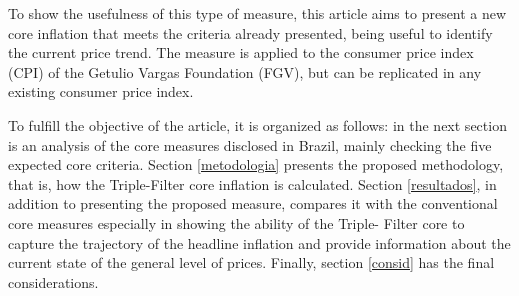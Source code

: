 \documentclass[10pt]{article}
\begin{document}

To show the usefulness of this type of measure, this article aims to present a new core inflation that meets the criteria already presented, being useful to identify the current price trend. The measure is applied to the consumer price index (CPI) of the Getulio Vargas Foundation (FGV), but can be replicated in any existing consumer price index.


To fulfill the objective of the article, it is organized as follows: in the next section is an analysis of the core measures disclosed in Brazil, mainly checking the five expected core criteria. Section \ref{metodologia} presents the proposed methodology, that is, how the Triple-Filter core inflation is calculated. Section \ref{resultados}, in addition to presenting the proposed measure, compares it with the conventional core measures especially in showing the ability of the Triple- Filter core to capture the trajectory of the headline inflation and provide information about the current state of the general level of prices. Finally, section \ref{consid} has the final considerations.

\end{document}
